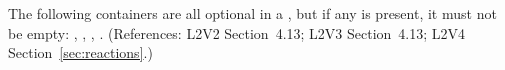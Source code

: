The following containers are all optional in a \Reaction, but if any
is present, it must not be empty: ,
, , .
(References: L2V2 Section~4.13; L2V3 Section~4.13; L2V4 Section~\ref{sec:reactions}.)
